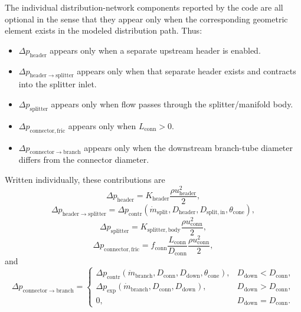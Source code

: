 \documentclass[11pt]{article}
\begin{document}
The individual distribution-network components reported by the code are all optional in the sense that they appear only when the corresponding geometric element exists in the modeled distribution path. Thus:
\begin{itemize}[leftmargin=*]
\item \(\Delta p_{\mathrm{header}}\) appears only when a separate upstream header is enabled.
\item \(\Delta p_{\mathrm{header\rightarrow splitter}}\) appears only when that separate header exists and contracts into the splitter inlet.
\item \(\Delta p_{\mathrm{splitter}}\) appears only when flow passes through the splitter/manifold body.
\item \(\Delta p_{\mathrm{connector,fric}}\) appears only when \(L_{\mathrm{conn}}>0\).
\item \(\Delta p_{\mathrm{connector\rightarrow branch}}\) appears only when the downstream branch-tube diameter differs from the connector diameter.
\end{itemize}
Written individually, these contributions are
\begin{equation}
\label{eq:header_loss}
\Delta p_{\mathrm{header}}=K_{\mathrm{header}}\frac{\rho u_{\mathrm{header}}^2}{2},
\end{equation}
\begin{equation}
\label{eq:header_to_splitter_loss}
\Delta p_{\mathrm{header\rightarrow splitter}}=
\Delta p_{\mathrm{contr}}\!\left(
\dot m_{\mathrm{split}},
D_{\mathrm{header}},
D_{\mathrm{split,in}},
\theta_{\mathrm{cone}}
\right),
\end{equation}
\begin{equation}
\label{eq:splitter_loss}
\Delta p_{\mathrm{splitter}}=K_{\mathrm{splitter,body}}\frac{\rho u_{\mathrm{conn}}^2}{2},
\end{equation}
\begin{equation}
\label{eq:connector_friction_loss}
\Delta p_{\mathrm{connector,fric}}=
f_{\mathrm{conn}}\frac{L_{\mathrm{conn}}}{D_{\mathrm{conn}}}\frac{\rho u_{\mathrm{conn}}^2}{2},
\end{equation}
and
\begin{equation}
\label{eq:connector_to_branch_loss}
\Delta p_{\mathrm{connector\rightarrow branch}}=
\begin{cases}
\Delta p_{\mathrm{contr}}\!\left(\dot m_{\mathrm{branch}},D_{\mathrm{conn}},D_{\mathrm{down}},\theta_{\mathrm{cone}}\right), & D_{\mathrm{down}}<D_{\mathrm{conn}},\\[4pt]
\Delta p_{\mathrm{exp}}\!\left(\dot m_{\mathrm{branch}},D_{\mathrm{conn}},D_{\mathrm{down}}\right), & D_{\mathrm{down}}>D_{\mathrm{conn}},\\[4pt]
0, & D_{\mathrm{down}}=D_{\mathrm{conn}}.
\end{cases}
\end{equation}
\end{document}
